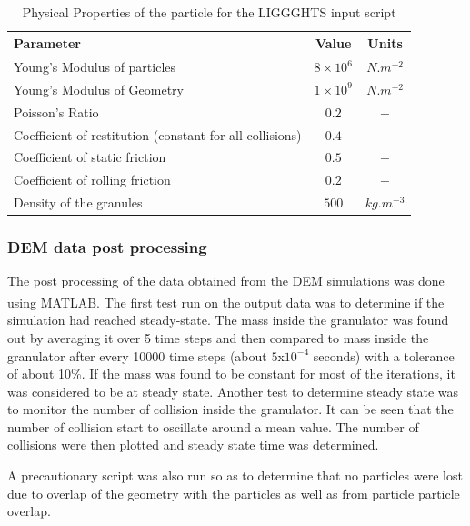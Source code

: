 \documentclass[preprint,11pt,authoryear]{elsarticle}
\begin{document}
	    	\begin{table}[!htb]%
	\caption{Physical Properties of the particle for the LIGGGHTS\textsuperscript{\textregistered} input script} \label{table:mthds_dem_input}
	\begin{center}
	\begin{tabular}{l|c|c}
	\hline
	\bf{Parameter} &\bf{Value} &\bf{Units}\\
	\hline
	Young's Modulus of particles  & $8 \times 10^{6}$ & $N.m^{-2}$\\
	Young's Modulus of Geometry  & $1 \times 10^{9}$ & $N.m^{-2}$\\
	Poisson's Ratio & $0.2$ & $-$\\
	Coefficient of restitution (constant for all collisions) & $0.4$ & $-$\\
	Coefficient of static friction & $0.5$ & $-$\\
	Coefficient of rolling friction  & $0.2$ & $-$\\
	Density of the granules & $500$ & $kg.m^{-3}$\\
	\hline
	\end{tabular}
	\end{center}
	\end{table}

	    \subsubsection{DEM data post processing}
	    \par The post processing of the data obtained from the DEM simulations was done using MATLAB\textsuperscript{\textregistered}. The first test run on the output data was to determine if the simulation had reached steady-state. The mass inside the granulator was found out by averaging it over 5 time steps and then compared to mass inside the granulator after every 10000 time steps (about $5$x$10^{-4}$ seconds) with a tolerance of about 10\%. If the mass was found to be constant for most of the iterations, it was considered to be at steady state. Another test to determine steady state was to monitor the number of collision inside the granulator. It can be seen that the number of collision start to oscillate around a mean value. The number of collisions were then plotted and steady state time was determined. 
	    \par A precautionary script was also run so as to determine that no particles were lost due to overlap of the geometry with the particles as well as from particle particle overlap.
	     
\end{document}
